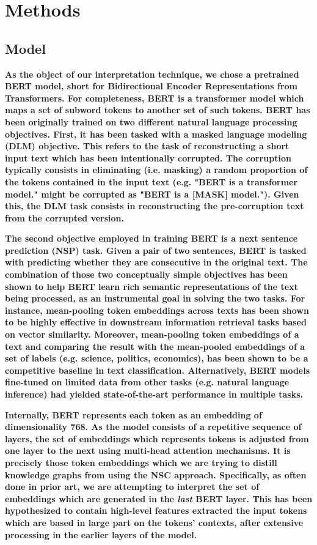 \section{Methods}\label{sec:methods}

\subsection{Model}

\textbf{As the object of our interpretation technique, we chose a pretrained BERT model, short for Bidirectional Encoder Representations from Transformers. For completeness, BERT is a transformer model which maps a set of subword tokens to another set of such tokens. BERT has been originally trained on two different natural language processing objectives. First, it has been tasked with a masked language modeling (DLM) objective. This refers to the task of reconstructing a short input text which has been intentionally corrupted. The corruption typically consists in eliminating (i.e. masking) a random proportion of the tokens contained in the input text (e.g. "BERT is a transformer model." might be corrupted as "BERT is a [MASK] model."). Given this, the DLM task consists in reconstructing the pre-corruption text from the corrupted version.}

\textbf{The second objective employed in training BERT is a next sentence prediction (NSP) task. Given a pair of two sentences, BERT is tasked with predicting whether they are consecutive in the original text. The combination of those two conceptually simple objectives has been shown to help BERT learn rich semantic representations of the text being processed, as an instrumental goal in solving the two tasks. For instance, mean-pooling token embeddings across texts has been shown to be highly effective in downstream information retrieval tasks based on vector similarity. Moreover, mean-pooling token embeddings of a text and comparing the result with the mean-pooled embeddings of a set of labels (e.g. science, politics, economics), has been shown to be a competitive baseline in text classification. Alternatively, BERT models fine-tuned on limited data from other tasks (e.g. natural language inference) had yielded state-of-the-art performance in multiple tasks.}

\textbf{Internally, BERT represents each token as an embedding of dimensionality 768. As the model consists of a repetitive sequence of layers, the set of embeddings which represents tokens is adjusted from one layer to the next using multi-head attention mechanisms. It is precisely those token embeddings which we are trying to distill knowledge graphs from using the NSC approach. Specifically, as often done in prior art, we are attempting to interpret the set of embeddings which are generated in the \textit{last} BERT layer. This has been hypothesized to contain high-level features extracted the input tokens which are based in large part on the tokens' contexts, after extensive processing in the earlier layers of the model.}

